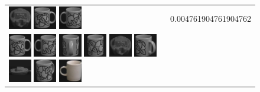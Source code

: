 \begin{figure}[!p]
\begin{center}
\begin{tabular}{m{11cm} | m{3cm} |}
\includegraphics[width=1cm]{coil/beeld-26.eps}
\includegraphics[width=1cm]{coil/beeld-48.eps}
\includegraphics[width=1cm]{coil/beeld-51.eps}
& {\scriptsize 0.004761904761904762}
\\
\includegraphics[width=1cm]{coil/beeld-48.eps}
\includegraphics[width=1cm]{coil/beeld-51.eps}
\includegraphics[width=1cm]{coil/beeld-50.eps}
\includegraphics[width=1cm]{coil/beeld-52.eps}
\includegraphics[width=1cm]{coil/beeld-26.eps}
\includegraphics[width=1cm]{coil/beeld-49.eps}
\includegraphics[width=1cm]{coil/beeld-27.eps}
\includegraphics[width=1cm]{coil/beeld-53.eps}
\includegraphics[width=1cm]{coil/beeld-37.eps}

\end{tabular}
\end{center}
\end{figure}
